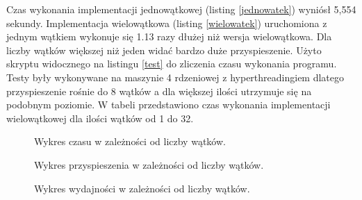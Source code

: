 Czas wykonania implementacji jednowątkowej (listing \ref{jednowatek}) wyniósł 5,554 sekundy. Implementacja wielowątkowa (listing \ref{wielowatek}) uruchomiona z jednym wątkiem wykonuje się 1.13 razy dłużej niż wersja wielowątkowa. Dla liczby wątków większej niż jeden widać bardzo duże przyspieszenie. Użyto skryptu widocznego na listingu \ref{test} do zliczenia czasu wykonania programu. Testy były wykonywane na maszynie 4 rdzeniowej z hyperthreadingiem dlatego przyspieszenie rośnie do 8 wątków a dla większej ilości utrzymuje się na podobnym poziomie. W tabeli przedstawiono czas wykonania implementacji wielowątkowej dla ilości wątków od 1 do 32.

\begin{figure}[ht!]
    \centering
    \caption{Wykres czasu w zależności od liczby wątków.}
    \label{wykres_czas}
\end{figure}

\begin{figure}[ht!]
    \centering
    \caption{Wykres przyspieszenia w zależności od liczby wątków.}
    \label{wykres_przyspieszenie}
\end{figure}

\begin{figure}[ht!]
    \centering
    \caption{Wykres wydajności w zależności od liczby wątków.}
    \label{wykres_wydajnosc}
\end{figure}



%
%


